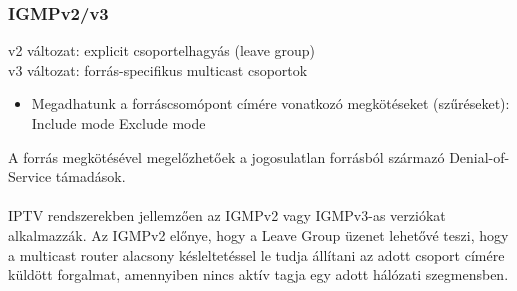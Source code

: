 \documentclass[10pt,a4paper]{article}
\begin{document}
\subsubsection{IGMPv2/v3}
v2 változat: explicit csoportelhagyás (leave group)\\
v3 változat: forrás-specifikus multicast csoportok\\
\begin{itemize}
	\item Megadhatunk a forráscsomópont címére vonatkozó
megkötéseket (szűréseket):
\subitem Include mode
\subitem Exclude mode
\end{itemize}
A forrás megkötésével megelőzhetőek a jogosulatlan
forrásból származó Denial-of-Service támadások.
\\~\\
IPTV rendszerekben jellemzően az IGMPv2 vagy IGMPv3-as verziókat
alkalmazzák. Az IGMPv2 előnye, hogy a Leave Group üzenet lehetővé
teszi, hogy a multicast router alacsony késleltetéssel le tudja állítani az adott
csoport címére küldött forgalmat, amennyiben nincs aktív tagja egy adott
hálózati szegmensben.
\end{document}
